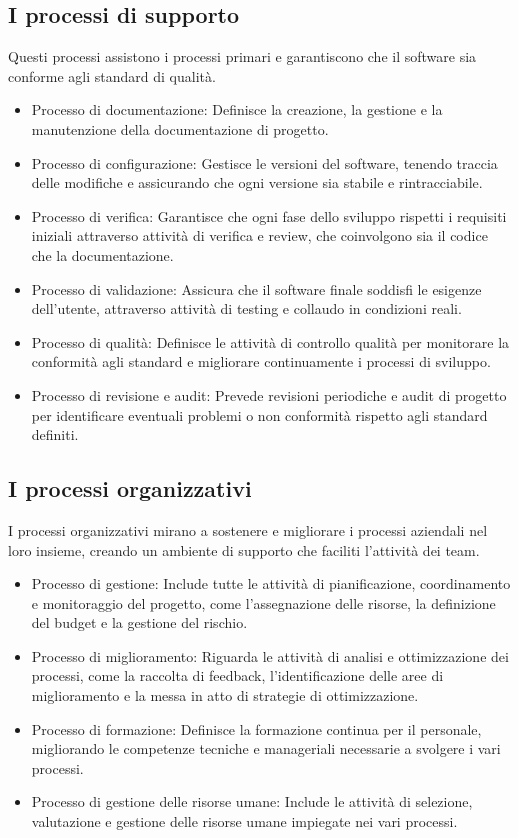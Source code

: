 \subsection{I processi di supporto}
Questi processi assistono i processi primari e garantiscono che il software sia conforme agli standard di qualità.
\begin{itemize}
    \item Processo di documentazione: Definisce la creazione, la gestione e la manutenzione della documentazione di progetto.
    \item Processo di configurazione: Gestisce le versioni del software, tenendo traccia delle modifiche e assicurando che ogni versione sia stabile e rintracciabile.
    \item Processo di verifica: Garantisce che ogni fase dello sviluppo rispetti i requisiti iniziali attraverso attività di verifica e review, che coinvolgono sia il codice che la documentazione.
    \item Processo di validazione: Assicura che il software finale soddisfi le esigenze dell'utente, attraverso attività di testing e collaudo in condizioni reali.
    \item Processo di qualità: Definisce le attività di controllo qualità per monitorare la conformità agli standard e migliorare continuamente i processi di sviluppo.
    \item Processo di revisione e audit: Prevede revisioni periodiche e audit di progetto per identificare eventuali problemi o non conformità rispetto agli standard definiti.
\end{itemize}

\subsection{I processi organizzativi}
I processi organizzativi mirano a sostenere e migliorare i processi aziendali nel loro insieme, creando un ambiente di supporto che faciliti l'attività dei team.
\begin{itemize}
    \item Processo di gestione: Include tutte le attività di pianificazione, coordinamento e monitoraggio del progetto, come l'assegnazione delle risorse, la definizione del budget e la gestione del rischio.
    \item Processo di miglioramento: Riguarda le attività di analisi e ottimizzazione dei processi, come la raccolta di feedback, l'identificazione delle aree di miglioramento e la messa in atto di strategie di ottimizzazione.
    \item Processo di formazione: Definisce la formazione continua per il personale, migliorando le competenze tecniche e manageriali necessarie a svolgere i vari processi.
    \item Processo di gestione delle risorse umane: Include le attività di selezione, valutazione e gestione delle risorse umane impiegate nei vari processi.
\end{itemize}

